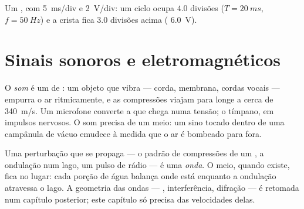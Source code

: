 \begin{omfigure}

{\small Um , com  \qty{5}{ms}/div e 
\qty{2}{V}/div: um ciclo ocupa $4.0$ divisões ($T = \qty{20}{ms}$,
$f = \qty{50}{Hz}$) e a crista fica $3.0$ divisões acima (
\qty{6.0}{V}).}
\end{omfigure}

\section{Sinais sonoros e eletromagnéticos}

\begin{definition}[Som]\label{def:g10:signals-and-waves:sound}
O \emph{som} é um  de : um objeto que vibra ---
corda, membrana, cordas vocais --- empurra o ar ritmicamente, e as
compressões viajam para longe a cerca de \qty{340}{m/s}. Um microfone
converte a  que chega numa tensão; o tímpano, em impulsos
nervosos. O som precisa de um meio: um sino tocado dentro de uma campânula
de vácuo emudece à medida que o ar é bombeado para fora.
\end{definition}

\begin{definition}[Onda]\label{def:g10:signals-and-waves:wave}
Uma perturbação que se propaga --- o padrão de compressões de um , a
ondulação num lago, um pulso de rádio --- é uma \emph{onda}.
O meio, quando existe, fica no lugar: cada porção de água balança onde
está enquanto a ondulação atravessa o lago. A geometria das ondas ---
, interferência, difração --- é retomada num capítulo
posterior; este capítulo só precisa das velocidades delas.
\end{definition}

